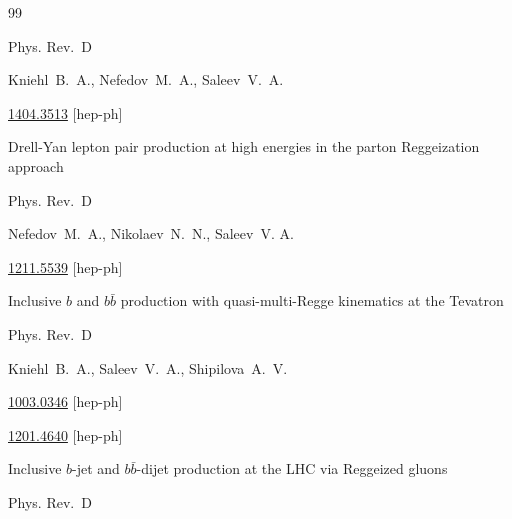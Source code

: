 \begin{thebibliography}{99}

\jour Phys. Rev.~D 



\by Kniehl~B.~A.,  Nefedov~M.~A., Saleev~V.~A.



\arxiv \href{http://arxiv.org/abs/1404.3513}{1404.3513} [hep-ph]




\paper Drell-Yan lepton pair production at high energies in the parton Reggeization approach


\jour Phys. Rev.~D 



\by  Nefedov~M.~A.,  Nikolaev~N.~N., Saleev~V. A.



\arxiv \href{http://arxiv.org/abs/1211.5539}{1211.5539} [hep-ph]






\paper Inclusive $b$ and $b \bar b$  production with quasi-multi-Regge kinematics at the Tevatron


\jour Phys. Rev.~D 



\by Kniehl~B.~A., Saleev~V.~A.,  Shipilova~A.~V.



\arxiv \href{http://arxiv.org/abs/1003.0346}{1003.0346} [hep-ph]




\arxiv \href{http://arxiv.org/abs/1201.4640}{1201.4640} [hep-ph]

\paper Inclusive $b$-jet and $b \bar b$-dijet production at the LHC via Reggeized gluons


\jour Phys. Rev.~D 


\end{thebibliography}
